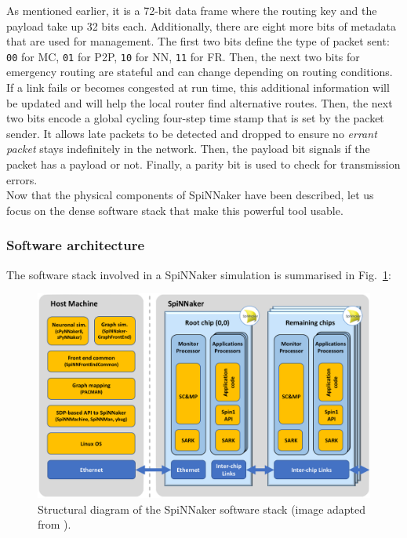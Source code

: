 As mentioned earlier, it is a 72-bit data frame where the routing key and the payload take up 32 bits each. Additionally, there are eight more bits of metadata that are used for management. The first two bits define the type of packet sent: \texttt{00} for MC, \texttt{01} for P2P, \texttt{10} for NN, \texttt{11} for FR. Then, the next two bits for emergency routing are stateful and can change depending on routing conditions. If a link fails or becomes congested at run time, this additional information will be updated and will help the local router find alternative routes. Then, the next two bits encode a global cycling four-step time stamp that is set by the packet sender. It allows late packets to be detected and dropped to ensure no \textit{errant packet} stays indefinitely in the network. Then, the payload bit signals if the packet has a payload or not. Finally, a parity bit is used to check for transmission errors. \\


Now that the physical components of SpiNNaker have been described, let us focus on the dense software stack that make this powerful tool usable.

\subsubsection{Software architecture} \label{sec:sw}

The software stack involved in a SpiNNaker simulation is summarised in Fig.~\ref{fig:software_stack}:

\begin{figure}[hbtp]
\centering
\includegraphics[width = 1\hsize]{figures/software_stack.png}
\caption{Structural diagram of the SpiNNaker software stack (image adapted from \cite{spinnaker}).}
\label{fig:software_stack}
\end{figure}

